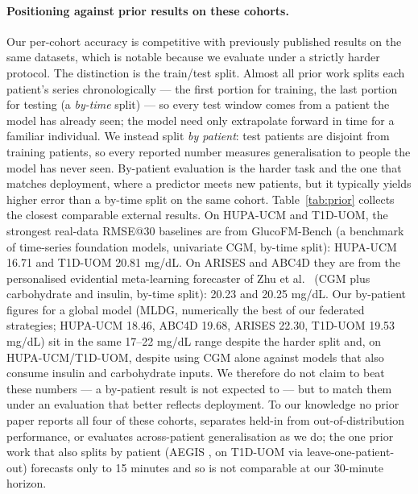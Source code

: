 \documentclass[10pt,letterpaper]{article}
\begin{document}
\paragraph{Positioning against prior results on these cohorts.} Our per-cohort
accuracy is competitive with previously published results on the same datasets,
which is notable because we evaluate under a strictly harder protocol. The
distinction is the train/test split. Almost all prior work splits each
patient's series chronologically --- the first portion for training, the last
portion for testing (a \emph{by-time} split) --- so every test window comes from
a patient the model has already seen; the model need only extrapolate forward in
time for a familiar individual. We instead split \emph{by patient}: test patients
are disjoint from training patients, so every reported number measures
generalisation to people the model has never seen. By-patient evaluation is the
harder task and the one that matches deployment, where a predictor meets new
patients, but it typically yields higher error than a by-time split on the same
cohort. Table~\ref{tab:prior} collects the closest comparable external results.
On HUPA-UCM and T1D-UOM, the strongest real-data RMSE@30 baselines are from
GlucoFM-Bench \cite{lu2026glucofmbench} (a benchmark of time-series foundation
models, univariate CGM, by-time split): HUPA-UCM 16.71 and T1D-UOM 20.81 mg/dL.
On ARISES and ABC4D they are from the personalised evidential meta-learning
forecaster of Zhu et al.\ \cite{zhu2023fcnn} (CGM plus carbohydrate and insulin,
by-time split): 20.23 and 20.25 mg/dL. Our by-patient figures for a global model
(MLDG, numerically the best of our federated strategies; HUPA-UCM 18.46, ABC4D
19.68, ARISES 22.30, T1D-UOM 19.53 mg/dL) sit in the same 17--22 mg/dL range
despite the harder split and, on
HUPA-UCM/T1D-UOM, despite using CGM alone against models that also consume
insulin and carbohydrate inputs. We therefore do not claim to beat these numbers
--- a by-patient result is not expected to --- but to match them under an
evaluation that better reflects deployment. To our knowledge no prior paper
reports all four of these cohorts, separates held-in from out-of-distribution
performance, or evaluates across-patient generalisation as we do; the one prior
work that also splits by patient (AEGIS \cite{pansheriya2026aegis}, on T1D-UOM
via leave-one-patient-out) forecasts only to 15 minutes and so is not comparable
at our 30-minute horizon.
\end{document}
